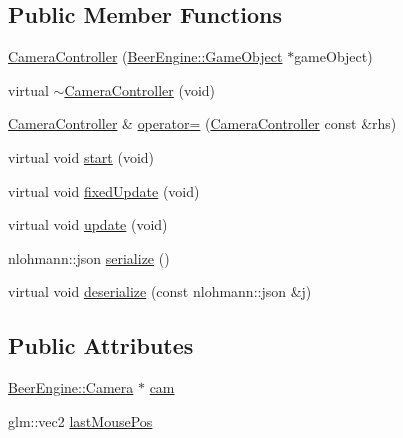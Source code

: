 \subsection*{Public Member Functions}
\begin{DoxyCompactItemize}
\item 
\mbox{\hyperlink{class_game_1_1_component_1_1_camera_controller_ac9ced75e848e973c4a2f25e25059a4f7}{Camera\+Controller}} (\mbox{\hyperlink{class_beer_engine_1_1_game_object}{Beer\+Engine\+::\+Game\+Object}} $\ast$game\+Object)
\item 
virtual \mbox{\hyperlink{class_game_1_1_component_1_1_camera_controller_a6cbf885ec5705638f392a40bb762bd9c}{$\sim$\+Camera\+Controller}} (void)
\item 
\mbox{\hyperlink{class_game_1_1_component_1_1_camera_controller}{Camera\+Controller}} \& \mbox{\hyperlink{class_game_1_1_component_1_1_camera_controller_a5b4d4521b4ceeba0f98ba3663015725c}{operator=}} (\mbox{\hyperlink{class_game_1_1_component_1_1_camera_controller}{Camera\+Controller}} const \&rhs)
\item 
virtual void \mbox{\hyperlink{class_game_1_1_component_1_1_camera_controller_afe64421588babbf921d77756fa38a48b}{start}} (void)
\item 
virtual void \mbox{\hyperlink{class_game_1_1_component_1_1_camera_controller_a0bdce3356bde07f277e0c58409c1f55d}{fixed\+Update}} (void)
\item 
virtual void \mbox{\hyperlink{class_game_1_1_component_1_1_camera_controller_a675655ee2e18382203f1afa2329a1739}{update}} (void)
\item 
nlohmann\+::json \mbox{\hyperlink{class_game_1_1_component_1_1_camera_controller_a1a7f36bf3f1f25b0edd404146f0c3289}{serialize}} ()
\item 
virtual void \mbox{\hyperlink{class_game_1_1_component_1_1_camera_controller_a8076e01593ef38a83c708854906abb3b}{deserialize}} (const nlohmann\+::json \&j)
\end{DoxyCompactItemize}
\subsection*{Public Attributes}
\begin{DoxyCompactItemize}
\item 
\mbox{\hyperlink{class_beer_engine_1_1_camera}{Beer\+Engine\+::\+Camera}} $\ast$ \mbox{\hyperlink{class_game_1_1_component_1_1_camera_controller_a5e619d2b8d42b5b55e743392bdd18ebd}{cam}}
\item 
glm\+::vec2 \mbox{\hyperlink{class_game_1_1_component_1_1_camera_controller_ab87262dadb4c07a9777393d85ad0ed28}{last\+Mouse\+Pos}}
\end{DoxyCompactItemize}
